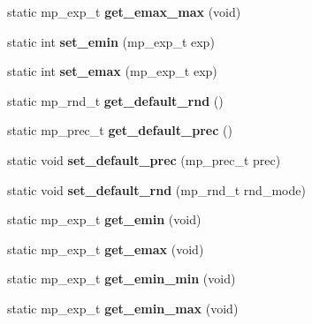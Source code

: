 \begin{DoxyCompactItemize}
static mp\+\_\+exp\+\_\+t {\bfseries get\+\_\+emax\+\_\+max} (void)
\item 
\mbox{\label{classmpfr_1_1mpreal_a50385a3c1da8ba2581a85e55862d2278}} 
static int {\bfseries set\+\_\+emin} (mp\+\_\+exp\+\_\+t exp)
\item 
\mbox{\label{classmpfr_1_1mpreal_a92c6a0583c16f828e4a4a0a43e817874}} 
static int {\bfseries set\+\_\+emax} (mp\+\_\+exp\+\_\+t exp)
\item 
\mbox{\label{classmpfr_1_1mpreal_ae0bdf9ca1838bd5851ac1c7c6b360553}} 
static mp\+\_\+rnd\+\_\+t {\bfseries get\+\_\+default\+\_\+rnd} ()
\item 
\mbox{\label{classmpfr_1_1mpreal_aae18e3b781bffbf4fd9938d4d3043aa1}} 
static mp\+\_\+prec\+\_\+t {\bfseries get\+\_\+default\+\_\+prec} ()
\item 
\mbox{\label{classmpfr_1_1mpreal_af19e3d58ae750c5d3381f4b9a7e98a09}} 
static void {\bfseries set\+\_\+default\+\_\+prec} (mp\+\_\+prec\+\_\+t prec)
\item 
\mbox{\label{classmpfr_1_1mpreal_ac746cef661eb8a20f594d1995a170d88}} 
static void {\bfseries set\+\_\+default\+\_\+rnd} (mp\+\_\+rnd\+\_\+t rnd\+\_\+mode)
\item 
\mbox{\label{classmpfr_1_1mpreal_adfa7bc19ede32e864f30b332075191e0}} 
static mp\+\_\+exp\+\_\+t {\bfseries get\+\_\+emin} (void)
\item 
\mbox{\label{classmpfr_1_1mpreal_a048bb70875fda41ccc0e2946363be55b}} 
static mp\+\_\+exp\+\_\+t {\bfseries get\+\_\+emax} (void)
\item 
\mbox{\label{classmpfr_1_1mpreal_a8f302518f7dc4655cc8f7096a8d7cf04}} 
static mp\+\_\+exp\+\_\+t {\bfseries get\+\_\+emin\+\_\+min} (void)
\item 
\mbox{\label{classmpfr_1_1mpreal_ad8464bb3d140b77b77bd517386ad7f98}} 
static mp\+\_\+exp\+\_\+t {\bfseries get\+\_\+emin\+\_\+max} (void)
\item 

\end{DoxyCompactItemize}
